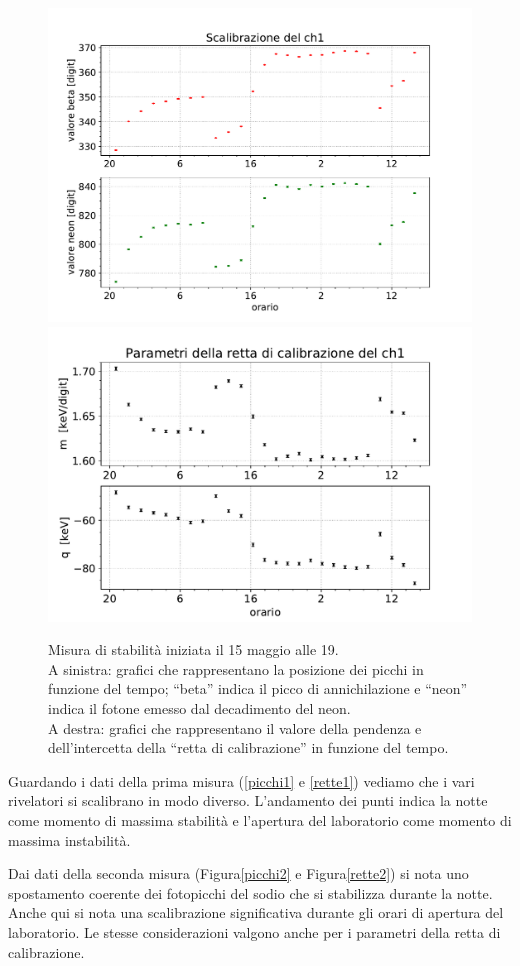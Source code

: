 \begin{figure}[h]
\centering
\subfloat
{
\includegraphics[width=19 em]{immagini/0515_picchi}
\label{picchi2}
}
\subfloat
{
\includegraphics[width=19.5 em]{immagini/0515_rette}
\label{rette2}
}
\caption{Misura di stabilità iniziata il 15 maggio alle 19.\\
A sinistra:  grafici che rappresentano la posizione dei picchi in funzione del tempo; ``beta'' indica il picco di annichilazione e ``neon'' indica il fotone emesso dal decadimento del neon. \\
A destra: grafici che rappresentano il valore della pendenza e dell'intercetta della ``retta di calibrazione'' in funzione del tempo.}

\end{figure}

Guardando i dati della prima misura (\autoref{picchi1} e \autoref{rette1}) vediamo che i vari rivelatori si scalibrano in modo diverso. L'andamento dei punti indica la notte come momento di massima stabilità e l'apertura del laboratorio come momento di massima instabilità.

Dai dati della seconda misura (Figura\autoref{picchi2} e Figura\autoref{rette2}) si nota uno spostamento coerente dei fotopicchi del sodio che si stabilizza durante la notte. Anche qui si nota una scalibrazione significativa durante gli orari di apertura del laboratorio.
Le stesse considerazioni valgono anche per i parametri della retta di calibrazione.